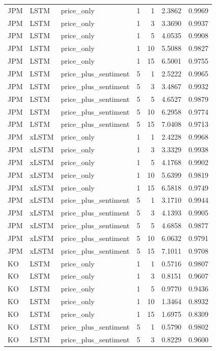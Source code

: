 \begin{longtable}{lllrrrr}
JPM & LSTM & price_only & 1 & 1 & 2.3862 & 0.9969 \\
JPM & LSTM & price_only & 1 & 3 & 3.3690 & 0.9937 \\
JPM & LSTM & price_only & 1 & 5 & 4.0535 & 0.9908 \\
JPM & LSTM & price_only & 1 & 10 & 5.5088 & 0.9827 \\
JPM & LSTM & price_only & 1 & 15 & 6.5001 & 0.9755 \\
JPM & LSTM & price_plus_sentiment & 5 & 1 & 2.5222 & 0.9965 \\
JPM & LSTM & price_plus_sentiment & 5 & 3 & 3.4867 & 0.9932 \\
JPM & LSTM & price_plus_sentiment & 5 & 5 & 4.6527 & 0.9879 \\
JPM & LSTM & price_plus_sentiment & 5 & 10 & 6.2958 & 0.9774 \\
JPM & LSTM & price_plus_sentiment & 5 & 15 & 7.0408 & 0.9713 \\
JPM & xLSTM & price_only & 1 & 1 & 2.4228 & 0.9968 \\
JPM & xLSTM & price_only & 1 & 3 & 3.3329 & 0.9938 \\
JPM & xLSTM & price_only & 1 & 5 & 4.1768 & 0.9902 \\
JPM & xLSTM & price_only & 1 & 10 & 5.6399 & 0.9819 \\
JPM & xLSTM & price_only & 1 & 15 & 6.5818 & 0.9749 \\
JPM & xLSTM & price_plus_sentiment & 5 & 1 & 3.1710 & 0.9944 \\
JPM & xLSTM & price_plus_sentiment & 5 & 3 & 4.1393 & 0.9905 \\
JPM & xLSTM & price_plus_sentiment & 5 & 5 & 4.6858 & 0.9877 \\
JPM & xLSTM & price_plus_sentiment & 5 & 10 & 6.0632 & 0.9791 \\
JPM & xLSTM & price_plus_sentiment & 5 & 15 & 7.1011 & 0.9708 \\
KO & LSTM & price_only & 1 & 1 & 0.5716 & 0.9807 \\
KO & LSTM & price_only & 1 & 3 & 0.8151 & 0.9607 \\
KO & LSTM & price_only & 1 & 5 & 0.9770 & 0.9436 \\
KO & LSTM & price_only & 1 & 10 & 1.3464 & 0.8932 \\
KO & LSTM & price_only & 1 & 15 & 1.6975 & 0.8309 \\
KO & LSTM & price_plus_sentiment & 5 & 1 & 0.5790 & 0.9802 \\
KO & LSTM & price_plus_sentiment & 5 & 3 & 0.8229 & 0.9600 \\

\end{longtable}

